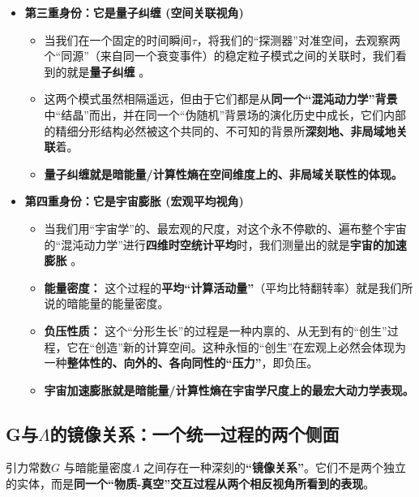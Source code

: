 \documentclass[11pt, a4paper]{article}
\begin{document}
\begin{itemize}
    \item \textbf{第三重身份：它是量子纠缠 (空间关联视角)}
    \begin{itemize}
        \item 当我们在一个固定的时间瞬间$\tau$，将我们的“探测器”对准空间，去观察两个“同源”（来自同一个衰变事件）的稳定粒子模式之间的关联时，我们看到的就是\textbf{量子纠缠} \cite{Bell1964}。
        \item 这两个模式虽然相隔遥远，但由于它们都是从\textbf{同一个“混沌动力学”背景}中“结晶”而出，并在同一个“伪随机”背景场的演化历史中成长，它们内部的精细分形结构必然被这个共同的、不可知的背景所\textbf{深刻地、非局域地关联}着。
        \item \textbf{量子纠缠就是暗能量/计算性熵在空间维度上的、非局域关联性的体现。}
    \end{itemize}

    \item \textbf{第四重身份：它是宇宙膨胀 (宏观平均视角)}
    \begin{itemize}
        \item 当我们用“宇宙学”的、最宏观的尺度，对这个永不停歇的、遍布整个宇宙的“混沌动力学”进行\textbf{四维时空统计平均}时，我们测量出的就是\textbf{宇宙的加速膨胀} \cite{Planck2020}。
        \item \textbf{能量密度：} 这个过程的\textbf{平均“计算活动量”}（平均比特翻转率）就是我们所说的暗能量的能量密度。
        \item \textbf{负压性质：} 这个“分形生长”的过程是一种内禀的、从无到有的“创生”过程，它在“创造”新的计算空间。这种永恒的“创生”在宏观上必然会体现为一种\textbf{整体性的、向外的、各向同性的“压力”}，即负压。
        \item \textbf{宇宙加速膨胀就是暗能量/计算性熵在宇宙学尺度上的最宏大动力学表现。}
    \end{itemize}
\end{itemize}

\subsection{G与$\Lambda$的镜像关系：一个统一过程的两个侧面}

引力常数$G$ \cite{Newton1687}与暗能量密度$\Lambda$ \cite{Planck2020}之间存在一种深刻的\textbf{“镜像关系”}。它们不是两个独立的实体，而是\textbf{同一个“物质-真空”交互过程从两个相反视角所看到的表现}。
\end{document}
